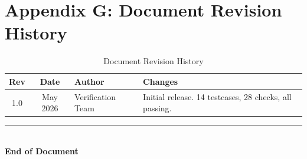 \section{Appendix G: Document Revision History}

\begin{table}[H]
\centering
\caption{Document Revision History}
\begin{tabularx}{\textwidth}{@{}cclX@{}}
\toprule
\textbf{Rev} & \textbf{Date} & \textbf{Author} & \textbf{Changes} \\
\midrule
1.0 & May 2026 & Verification Team & Initial release. 14 testcases, 28 checks, all passing. \\
\bottomrule
\end{tabularx}
\end{table}

\vfill
\begin{center}
\rule{0.5\textwidth}{0.4pt}\\[0.5cm]
{\large\textbf{End of Document}}
\end{center}

